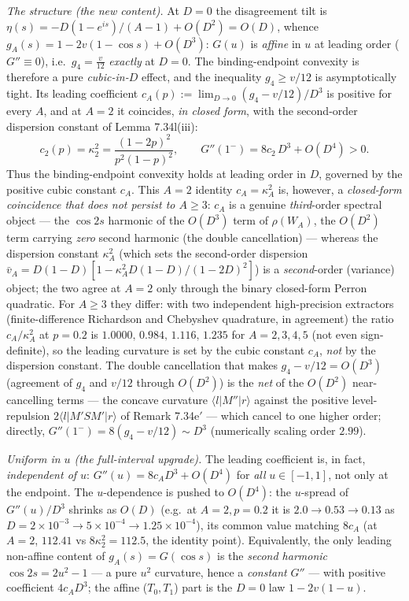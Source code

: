 \documentclass[
]{article}
\begin{document}
\emph{The structure (the new content).} At $D=0$ the disagreement tilt is
$\eta(s)=-D(1-e^{is})/(A-1)+O(D^2)=O(D)$, whence $g_A(s)=1-2v(1-\cos s)+O(D^3)$:
$G(u)$ is \emph{affine} in $u$ at leading order ($G''\equiv0$), i.e.\
$g_4=\tfrac{v}{12}$ \emph{exactly} at $D=0$. The binding-endpoint convexity is
therefore a pure \emph{cubic-in-$D$} effect, and the inequality $g_4\ge v/12$ is
asymptotically tight. Its leading coefficient
$c_A(p):=\lim_{D\to0}(g_4-v/12)/D^3$ is positive for every $A$, and at $A=2$ it
coincides, \emph{in closed form}, with the second-order dispersion constant of
Lemma 7.34l(iii):
\[
  c_2(p)=\kappa_2^2=\frac{(1-2p)^2}{p^2(1-p)^2},\qquad
  G''(1^-)=8c_2\,D^3+O(D^4)>0 .
\]
Thus the binding-endpoint convexity holds at leading order in $D$, governed by
the positive cubic constant $c_A$. This $A=2$ identity $c_A=\kappa_A^2$ is,
however, a \emph{closed-form coincidence that does not persist to $A\ge3$}: $c_A$
is a genuine \emph{third}-order spectral object --- the $\cos2s$ harmonic of the
$O(D^3)$ term of $\rho(W_A)$, the $O(D^2)$ term carrying \emph{zero} second
harmonic (the double cancellation) --- whereas the dispersion constant
$\kappa_A^2$ (which sets the second-order dispersion
$\bar v_A=D(1-D)[1-\kappa_A^2 D(1-D)/(1-2D)^2]$) is a \emph{second}-order
(variance) object; the two agree at $A=2$ only through the binary closed-form
Perron quadratic. For $A\ge3$ they differ: with two independent high-precision
extractors (finite-difference Richardson and Chebyshev quadrature, in agreement)
the ratio $c_A/\kappa_A^2$ at $p=0.2$ is $1.0000,\,0.984,\,1.116,\,1.235$ for
$A=2,3,4,5$ (not even sign-definite), so the leading curvature is set by the
cubic constant $c_A$, \emph{not} by the dispersion constant. The double
cancellation that makes $g_4-v/12=O(D^3)$ (agreement of $g_4$ and $v/12$ through
$O(D^2)$) is the \emph{net} of the $O(D^2)$ near-cancelling terms --- the concave
curvature $\langle l|M''|r\rangle$ against the positive level-repulsion
$2\langle l|M'SM'|r\rangle$ of Remark 7.34e$'$ --- which cancel to one higher
order; directly, $G''(1^-)=8(g_4-v/12)\sim D^3$ (numerically scaling order
$2.99$).

\emph{Uniform in $u$ (the full-interval upgrade).} The leading coefficient is, in
fact, \emph{independent of $u$}: $G''(u)=8c_A D^3+O(D^4)$ for \emph{all}
$u\in[-1,1]$, not only at the endpoint. The $u$-dependence is pushed to $O(D^4)$:
the $u$-spread of $G''(u)/D^3$ shrinks as $O(D)$ (e.g.\ at $A=2,p=0.2$ it is
$2.0\to0.53\to0.13$ as $D=2{\times}10^{-3}\to5{\times}10^{-4}\to1.25{\times}10^{-4}$),
its common value matching $8c_A$ (at $A=2$, $112.41$ vs $8\kappa_2^2=112.5$, the
identity point). Equivalently, the only leading non-affine content of
$g_A(s)=G(\cos s)$ is the \emph{second harmonic} $\cos2s=2u^2-1$ --- a pure $u^2$
curvature, hence a \emph{constant} $G''$ --- with positive coefficient
$4c_A D^3$; the
affine ($T_0,T_1$) part is the $D=0$ law $1-2v(1-u)$.
\end{document}
